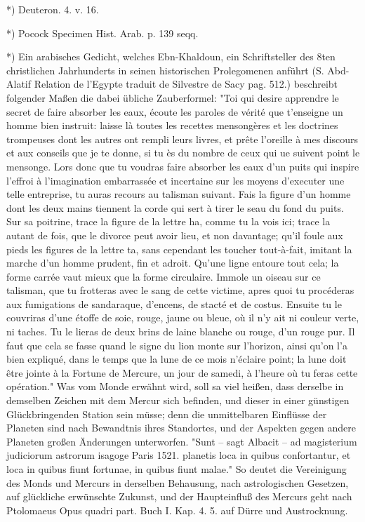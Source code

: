 \documentclass[a4paper, 11pt, oneside, polutonikogreek, german]{article}
\begin{document}
*) Deuteron. 4. v. 16.

*) Pocock Specimen Hist. Arab. p. 139 seqq.

*) Ein arabisches Gedicht, welches Ebn-Khaldoun, ein Schriftsteller des 8ten christlichen Jahrhunderts in seinen historischen Prolegomenen anführt (S. Abd-Alatif Relation de l'Egypte traduit de Silvestre de Sacy pag. 512.) beschreibt folgender Maßen die dabei übliche Zauberformel:
"Toi qui desire apprendre le secret de faire absorber les eaux, écoute les paroles de vérité que t'enseigne un homme bien instruit: laisse là toutes les recettes mensongères et les doctrines trompeuses dont les autres ont rempli leurs livres, et prête l'oreille à mes discours et aux conseils que je te donne, si tu ès du nombre de ceux qui ue suivent point le mensonge. Lors donc que tu voudras faire absorber les eaux d'un puits qui inspire l'effroi à l'imagination embarrassée et incertaine sur les moyens d'executer une telle entreprise, tu auras recours au talisman suivant. Fais la figure d'un homme dont les deux mains tiennent la corde qui sert à tirer le seau du fond du puits. Sur sa poitrine, trace la figure de la lettre ha, comme tu la vois ici; trace la autant de fois, que le divorce peut avoir lieu, et non davantage; qu'il foule aux pieds les figures de la lettre ta, sans cependant les toucher tout-à-fait, imitant la marche d'un homme prudent, fin et adroit. Qu'une ligne entoure tout cela; la forme carrée vaut mieux que la forme circulaire. Immole un oiseau sur ce talisman, que tu frotteras avec le sang de cette victime, apres quoi tu procéderas aux fumigations de sandaraque, d'encens, de stacté et de costus. Ensuite tu le couvriras d'une étoffe de soie, rouge, jaune ou bleue, où il n'y ait ni couleur verte, ni taches. Tu le lieras de deux brins de laine blanche ou rouge, d'un rouge pur. Il faut que cela se fasse quand le signe du lion monte sur l'horizon, ainsi qu'on l'a bien expliqué, dans le temps que la lune de ce mois n'éclaire point; la lune doit être jointe à la Fortune de Mercure, un jour de samedi, à l'heure où tu feras cette opération."
Was vom Monde erwähnt wird, soll sa viel heißen, dass derselbe in demselben Zeichen mit dem Mercur sich befinden, und dieser in einer günstigen Glückbringenden Station sein müsse; denn die unmittelbaren Einflüsse der Planeten sind nach Bewandtnis ihres Standortes, und der Aspekten gegen andere Planeten großen Änderungen unterworfen. "Sunt -- sagt Albacit -- ad magisterium judiciorum astrorum isagoge Paris 1521. planetis loca in quibus confortantur, et loca in quibus fiunt fortunae, in quibus fiunt malae." So deutet die Vereinigung des Monds und Mercurs in derselben Behausung, nach astrologischen Gesetzen, auf glückliche erwünschte Zukunst, und der Haupteinfluß des Mercurs geht nach Ptolomaeus Opus quadri part. Buch I. Kap. 4. 5. auf Dürre und Austrocknung.
\end{document}
